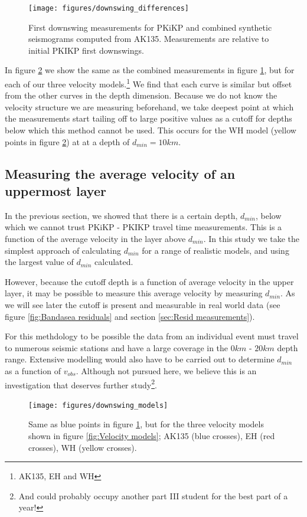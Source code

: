 \documentclass[11pt,a4paper]{article}
\begin{document}
\begin{figure}
	\centering
	\texttt{[image: figures/downswing\_differences]}
	\caption{First downswing measurements for PKiKP and combined synthetic seismograms computed from AK135. Measurements are relative to initial PKIKP first downswings.}
	\label{fig:Downswing differences}
\end{figure}

In figure \ref{fig:Downswing models} we show the same as the combined measurements in figure \ref{fig:Downswing differences}, but for each of our three  velocity models.\footnote{AK135, EH and WH} We find that each curve is similar but offset from the other curves in the depth dimension. Because we do not know the velocity structure we are measuring beforehand, we take deepest point at which the measurements start tailing off to large positive values as a cutoff for depths below which this method cannot be used. This occurs for the WH model (yellow points in figure \ref{fig:Downswing models}) at at a depth of $d_{min} = 10km$.

\subsection{Measuring the average velocity of an uppermost layer}
In the previous section, we showed that there is a certain depth, $d_{min}$, below which we cannot trust PKiKP - PKIKP travel time measurements. This is a function of the average velocity in the layer above $d_{min}$. In this study we take the simplest approach of calculating $d_{min}$ for a range of realistic models, and using the largest value of $d_{min}$ calculated.

However, because the cutoff depth is a function of average velocity in the upper layer, it may be possible to measure this average velocity by measuring $d_{min}$. As we will see later the cutoff is present and measurable in real world data (see figure \ref{fig:Bandasea residuals} and section \ref{sec:Resid measurements}).

For this methdology to be possible the data from an individual event must travel to numerous seismic stations and have a large coverage in the $0km$ - $20km$ depth range. Extensive modelling would also have to be carried out to determine $d_{min}$ as a function of $v_{obs}$. Although not pursued here, we believe this is an investigation that deserves further study\footnote{And could probably occupy another part III student for the best part of a year!}.

\begin{figure}
	\centering
	\texttt{[image: figures/downswing\_models]}
	\caption{Same as blue points in figure \ref{fig:Downswing differences}, but for the three velocity models shown in figure \ref{fig:Velocity models}; AK135 (blue crosses), EH (red crosses), WH (yellow crosses).}
	\label{fig:Downswing models}
\end{figure}
\end{document}
